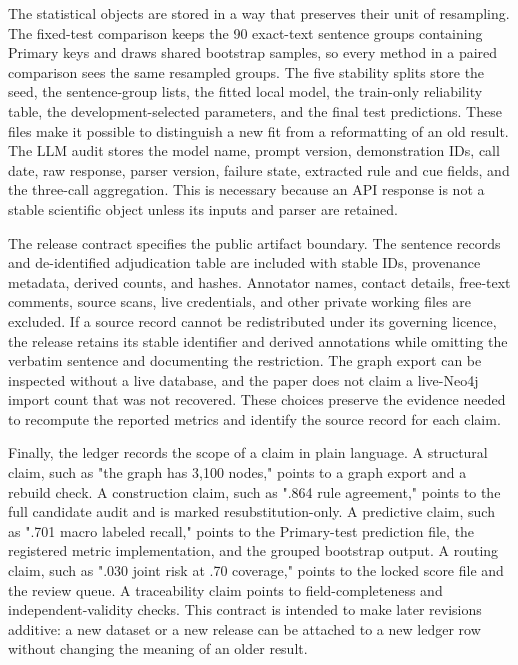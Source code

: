 \documentclass{CUP-JNL-NLP}
\begin{document}
The statistical objects are stored in a way that preserves their unit of resampling. The fixed-test comparison keeps the 90 exact-text sentence groups containing Primary keys and draws shared bootstrap samples, so every method in a paired comparison sees the same resampled groups. The five stability splits store the seed, the sentence-group lists, the fitted local model, the train-only reliability table, the development-selected parameters, and the final test predictions. These files make it possible to distinguish a new fit from a reformatting of an old result. The LLM audit stores the model name, prompt version, demonstration IDs, call date, raw response, parser version, failure state, extracted rule and cue fields, and the three-call aggregation. This is necessary because an API response is not a stable scientific object unless its inputs and parser are retained.

The release contract specifies the public artifact boundary. The sentence records and de-identified adjudication table are included with stable IDs, provenance metadata, derived counts, and hashes. Annotator names, contact details, free-text comments, source scans, live credentials, and other private working files are excluded. If a source record cannot be redistributed under its governing licence, the release retains its stable identifier and derived annotations while omitting the verbatim sentence and documenting the restriction. The graph export can be inspected without a live database, and the paper does not claim a live-Neo4j import count that was not recovered. These choices preserve the evidence needed to recompute the reported metrics and identify the source record for each claim.

Finally, the ledger records the scope of a claim in plain language. A structural claim, such as "the graph has 3,100 nodes," points to a graph export and a rebuild check. A construction claim, such as ".864 rule agreement," points to the full candidate audit and is marked resubstitution-only. A predictive claim, such as ".701 macro labeled recall," points to the Primary-test prediction file, the registered metric implementation, and the grouped bootstrap output. A routing claim, such as ".030 joint risk at .70 coverage," points to the locked score file and the review queue. A traceability claim points to field-completeness and independent-validity checks. This contract is intended to make later revisions additive: a new dataset or a new release can be attached to a new ledger row without changing the meaning of an older result.
\end{document}
